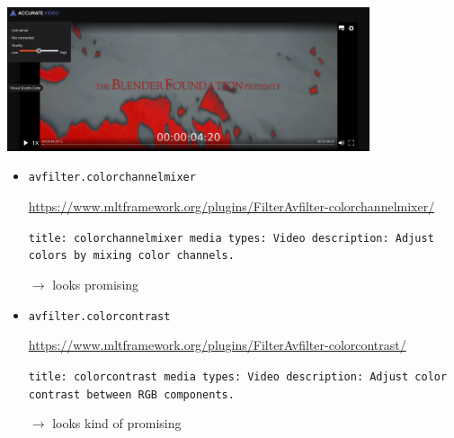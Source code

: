 \documentclass[12pt,a4paper]{article}
\begin{document}
\begin{itemize}
		\begin{center}
			\includegraphics[width=0.8\textwidth]{ap_red.png}
		\end{center}
		

	
		\newpage
		
		\begin{itemize}	
		
		\item \texttt{avfilter.colorchannelmixer}
		
		\url{https://www.mltframework.org/plugins/FilterAvfilter-colorchannelmixer/}
		
		\texttt{title: colorchannelmixer \newline
			media types: Video \newline
			description: Adjust colors by mixing color channels.}
		
		$\rightarrow$ looks promising
		
		
		

		

		
		\item \texttt{avfilter.colorcontrast}
		
		\url{https://www.mltframework.org/plugins/FilterAvfilter-colorcontrast/}
		
		\texttt{title: colorcontrast \newline
			media types: Video \newline
			description: Adjust color contrast between RGB components.}
		
		$\rightarrow$ looks kind of promising
		
		
		
		
		

\end{itemize}
\end{itemize}
\end{document}
